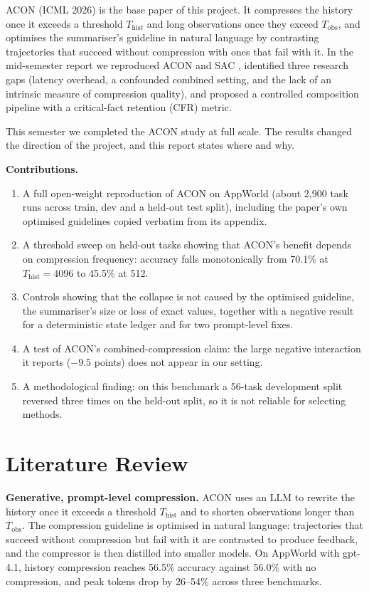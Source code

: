 \documentclass[10pt,a4paper]{article}
\begin{document}
ACON \cite{ACON} (ICML 2026) is the base paper of this project. It compresses
the history once it exceeds a threshold $T_{\mathrm{hist}}$ and long
observations once they exceed $T_{\mathrm{obs}}$, and optimises the
summariser's guideline in natural language by contrasting trajectories that
succeed without compression with ones that fail with it. In the mid-semester
report we reproduced ACON and SAC \cite{SAC}, identified three research gaps
(latency overhead, a confounded combined setting, and the lack of an intrinsic
measure of compression quality), and proposed a controlled composition pipeline
with a critical-fact retention (CFR) metric.

This semester we completed the ACON study at full scale. The results changed
the direction of the project, and this report states where and why.

\textbf{Contributions.}
\begin{enumerate}
\item A full open-weight reproduction of ACON on AppWorld (about 2,900 task runs
across train, dev and a held-out test split), including the paper's own
optimised guidelines copied verbatim from its appendix.
\item A threshold sweep on held-out tasks showing that ACON's benefit depends on
compression frequency: accuracy falls monotonically from 70.1\% at
$T_{\mathrm{hist}}=4096$ to 45.5\% at 512.
\item Controls showing that the collapse is not caused by the optimised
guideline, the summariser's size or loss of exact values, together with a
negative result for a deterministic state ledger and for two prompt-level fixes.
\item A test of ACON's combined-compression claim: the large negative
interaction it reports ($-9.5$ points) does not appear in our setting.
\item A methodological finding: on this benchmark a 56-task development split
reversed three times on the held-out split, so it is not reliable for selecting
methods.
\end{enumerate}

\section{Literature Review}

\textbf{Generative, prompt-level compression.} ACON \cite{ACON} uses an LLM to
rewrite the history once it exceeds a threshold $T_{\mathrm{hist}}$ and to
shorten observations longer than $T_{\mathrm{obs}}$. The compression guideline
is optimised in natural language: trajectories that succeed without
compression but fail with it are contrasted to produce feedback, and the
compressor is then distilled into smaller models. On AppWorld \cite{AppWorld}
with gpt-4.1, history compression reaches 56.5\% accuracy against 56.0\% with
no compression, and peak tokens drop by 26--54\% across three benchmarks.
\end{document}
